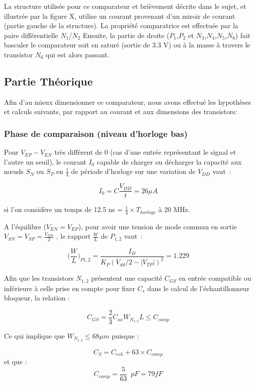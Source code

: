 \documentclass[11pt]{article}
\begin{document}
La structure utilis\'ee pour ce comparateur et bri\`evement d\'ecrite dans le sujet, et illustr\'ee par
la figure X, utilise un courant provenant d'un miroir de courant (partie gauche de la structure).
La propri\'et\'e comparatrice est effectu\'ee par la paire diff\'erentielle $N_1$/$N_2$ Ensuite, la partie de droite
($P_1$,$P_2$ et $N_3$,$N_4$,$N_5$,$N_6$) fait basculer le comparateur soit en satur\'e (sortie de 3.3 V)
ou \`a la masse \`a travers le transistor $N_6$ qui est alors passant.

\subsection{Partie Th\'eorique}
Afin d'au mieux dimensionner ce comparateur, nous avons effectu\'e les hypoth\`eses et calculs suivants,
par rapport au courant et aux dimensions des transistors:

\subsubsection{Phase de comparaison (niveau d'horloge bas)}

Pour $V_{EP}-V_{EN}$ tr\`es diff\'erent de $0$ (cas d'une entr\'ee repr\'esentant le signal et l'autre un seuil),
le courant $I_0$ capable de charger ou d\'echarger la capacit\'e aux nœuds $S_N$ ou $S_P$ en $\frac{1}{4}$ de
p\'eriode d'horloge sur une variation de $V_{DD}$ vaut :

\[
I_0 = C \frac{V_{DD}}{t} = 26 \mu A
\]

si l'on consid\`ere un temps de 12.5 ns = $\frac{1}{4} \times T_{horloge}$ \`a 20 MHz.

A l'\'equilibre ($V_{EN} = V_{EP}$), pour avoir une tension de mode commun en sortie
$V_{SN} = V_{SP} = \frac{V_{DD}}{2}$ , le rapport $\frac{W}{L}$ de $P_{1,2}$ vaut :

\[
  \bigg(\frac{W}{L}\bigg)_{P1,2} = \frac{I_D}{K_P (V_{dd}/2 - |V_{TP}|)^{2}} = 1.229
\]

Afin que les transistors $N_{1,2}$ pr\'esentent une capacit\'e $C_{GS}$ en entr\'ee compatible
ou inf\'erieure \`a celle prise en compte pour fixer $C_s$ dans le calcul de l'\'echantillonneur
bloqueur, la relation :

\[
  C_{GS} = \frac{2}{3} C_{ox} W_{N_{1,2}} L \leq C_{comp}
\]

Ce qui implique que $W_{N_{1,2}} \leq 68 \mu m$ puisque :

\[
  C_S = C_{ech} + 63 \times C_{comp}
\]
et que :
\[
  C_{comp} = \frac{5}{63} \phantom{2} pF = 79 fF
\]
\end{document}
